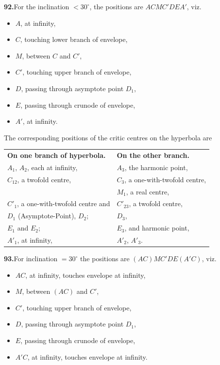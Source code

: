 \documentclass[11pt]{article}
\begin{document}
\medskip
\textbf{92.}\quad For the inclination $< 30^{\circ}$, the positions are $A C M C' D E A'$, viz.
\begin{itemize}\itemsep0pt
\item $A$, at infinity,
\item $C$, touching lower branch of envelope,
\item $M$, between $C$ and $C'$,
\item $C'$, touching upper branch of envelope,
\item $D$, passing through asymptote point $D_{1}$,
\item $E$, passing through crunode of envelope,
\item $A'$, at infinity.
\end{itemize}

The corresponding positions of the critic centres on the hyperbola are
\begin{center}
\begin{tabular}{ll}
\textbf{On one branch of hyperbola.} & \textbf{On the other branch.}\\[2pt]
$A_{1}$, $A_{2}$, each at infinity, & $A_{3}$, the harmonic point,\\
$C_{12}$, a twofold centre, & $C_{3}$, a one-with-twofold centre,\\
& $M_{1}$, a real centre,\\
$C'_{1}$, a one-with-twofold centre and & $C'_{23}$, a twofold centre,\\
$D_{1}$ (Asymptote-Point), $D_{2}$; & $D_{3}$,\\
$E_{1}$ and $E_{2}$; & $E_{3}$, and harmonic point,\\
$A'_{1}$, at infinity, & $A'_{2}$, $A'_{3}$.
\end{tabular}
\end{center}

\medskip
\textbf{93.}\quad For inclination $= 30^{\circ}$ the positions are $(AC) M C' D E (A'C)$, viz.
\begin{itemize}\itemsep0pt
\item $AC$, at infinity, touches envelope at infinity,
\item $M$, between $(AC)$ and $C'$,
\item $C'$, touching upper branch of envelope,
\item $D$, passing through asymptote point $D_{1}$,
\item $E$, passing through crunode of envelope,
\item $A'C$, at infinity, touches envelope at infinity.
\end{itemize}
\end{document}

